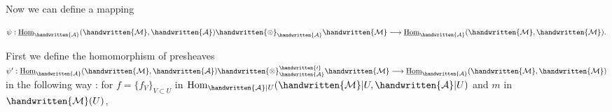 Now we can define a mapping

\[
\psi:\underline{\mathrm{Hom}}_{\handwritten{\mathcal{A}}}(\handwritten{\mathcal{M}},\handwritten{\mathcal{A}})\handwritten{\otimes}_{\handwritten{\mathcal{A}}}\handwritten{\mathcal{M}}\longrightarrow \underline{\mathrm{Hom}}_{\handwritten{\mathcal{A}}}(\handwritten{\mathcal{M}},\handwritten{\mathcal{M}}).
\]

First we define the homomorphism of presheaves
$\psi':\underline{\mathrm{Hom}}_{\handwritten{\mathcal{A}}}(\handwritten{\mathcal{M}},\handwritten{\mathcal{A}})\handwritten{\otimes}_{\handwritten{\mathcal{A}}}^{\handwritten{\prime}}\handwritten{\mathcal{M}}\longrightarrow \underline{\mathrm{Hom}}_{\handwritten{\mathcal{A}}}(\handwritten{\mathcal{M}},\handwritten{\mathcal{M}})$ in the following way : for
$f=\{f_V\}_{V\subset U}$ in $\mathrm{Hom}_{\handwritten{\mathcal{A}}|U}(\handwritten{\mathcal{M}}|U,\handwritten{\mathcal{A}}|U)$ and $m$ in $\handwritten{\mathcal{M}}(U)$,

